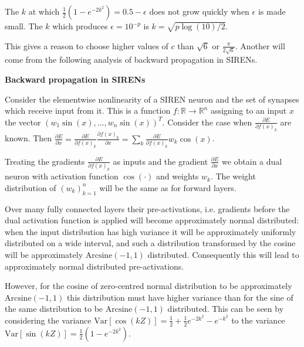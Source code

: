 \documentclass{letter}
\begin{document}
The $k$ at which $\frac{1}{2}(1-e^{-2k^2})=0.5-\epsilon$ does not grow quickly when $\epsilon$ is made small. The $k$ which produces $\epsilon=10^{-p}$ is $k=\sqrt{p\log(10)/2}$.

\begin{center}
\end{center}

This gives a reason to choose higher values of $c$ than $\sqrt{6}$ or $\frac{\pi}{2\sqrt{6}}$. Another will come from the following analysis of backward propagation in SIRENs.

{\bf Backward propagation in SIRENs}

Consider the elementwise nonlinearity of a SIREN neuron and the set of synapses which receive input from it. This is a function $f:\mathbb{R}\rightarrow \mathbb{R}^n$ assigning to an input $x$ the vector $\left(w_{1}\sin(x),...,w_{n}\sin(x)\right)^T$. Consider the case when $\frac{\partial E}{\partial f(x)_k}$ are known. Then $\frac{\partial E}{\partial x}=\frac{\partial E}{\partial f(x)_k}\frac{\partial f(x)_k}{\partial x}=\sum_k \frac{\partial E}{\partial f(x)_k}w_{k}\cos(x)$. 

Treating the gradients $\frac{\partial E}{\partial f(x)_k}$ as inputs and the gradient $\frac{\partial E}{\partial x}$ we obtain a dual neuron with activation function $\cos(\cdot)$ and weights $w_k$. The weight distribution of $\left(w_k\right)_{k=1}^n$ will be the same as for forward layers. 

Over many fully connected layers their pre-activations, i.e. gradients before the dual activation function is applied will become approximately normal distributed: when the input distribution has high variance it will be approximately uniformly distributed on a wide interval, and such a distribution transformed by the cosine will be approximately $\text{Arcsine}(-1,1)$ distributed. Consequently this will lead to approximately normal distributed pre-activations.

However, for the cosine of zero-centred normal distribution to be approximately $\text{Arcsine}(-1,1)$ this distribution must have higher variance than for the sine of the same distribution to be $\text{Arcsine}(-1,1)$ distributed. This can be seen by considering the variance $\text{Var}\left[\cos(kZ)\right] = \frac{1}{2} + \frac{1}{2}e^{-2k^2}-e^{-k^2}$ to the variance $\text{Var}\left[\sin(kZ)\right]=\frac{1}{2}(1-e^{-2k^2})$.
\end{document}
